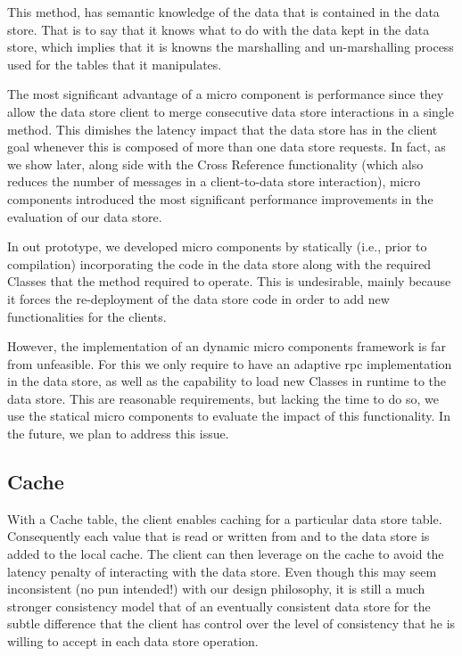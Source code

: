 This method, has semantic knowledge of the data that is contained in the data store. 
That is to say that it knows what to do with the data kept in the data store, which implies that it is knowns the marshalling and un-marshalling process used for the tables that it manipulates.

The most significant advantage of a micro component is performance since they allow the data store client to merge consecutive data store interactions in a single method.
This dimishes the latency impact that the data store has in the client goal whenever this is composed of more than one data store requests. 
In fact, as we show later, along side with the Cross Reference functionality (which also reduces the number of messages in a client-to-data store interaction), micro components  introduced the most significant performance improvements in the evaluation of our data store. 

In out prototype, we  developed micro components by statically (i.e., prior to compilation) incorporating the code in the data store along with the required Classes that the method required to operate. 
This is undesirable, mainly because it forces the re-deployment of the data store code in order to add new functionalities for the clients. 

However, the implementation of an dynamic micro components framework is far from unfeasible.
For this we only require to have an adaptive \gls{rpc} implementation in the data store, as well as the capability to load new Classes in runtime to the data store. 
This are reasonable requirements, but lacking the time to do so, we use the statical micro components to evaluate the impact of this functionality. 
In the future, we plan to address this issue. 

\subsection{Cache}
\label{sec:heimdall:cache}
With a Cache table, the client enables caching for a particular data store table. 
Consequently each value that is read or written from and to the data store is added to the local cache. 
The client can then leverage on the cache to avoid the latency penalty of interacting with  the data store. 
Even though this may seem inconsistent (no pun intended!)  with our design philosophy, it is still a much stronger consistency model that of an eventually consistent data store for the subtle  difference that the client has control over the level of consistency that he is willing to accept in each data store operation. 

